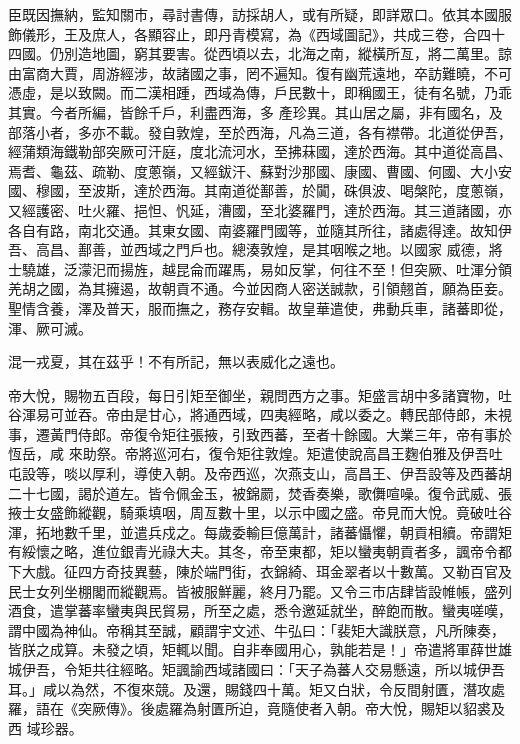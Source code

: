 \begin{pinyinscope}
 臣既因撫納，監知關市，尋討書傳，訪採胡人，或有所疑，即詳眾口。依其本國服飾儀形，王及庶人，各顯容止，即丹青模寫，為《西域圖記》，共成三卷，合四十四國。仍別造地圖，窮其要害。從西頃以去，北海之南，縱橫所亙，將二萬里。諒由富商大賈，周游經涉，故諸國之事，罔不遍知。復有幽荒遠地，卒訪難曉，不可憑虛，是以致闕。而二漢相踵，西域為傳，戶民數十，即稱國王，徒有名號，乃乖其實。今者所編，皆餘千戶，利盡西海，多
 產珍異。其山居之屬，非有國名，及部落小者，多亦不載。發自敦煌，至於西海，凡為三道，各有襟帶。北道從伊吾，經蒲類海鐵勒部突厥可汗庭，度北流河水，至拂菻國，達於西海。其中道從高昌、焉耆、龜茲、疏勒、度蔥嶺，又經鈸汗、蘇對沙那國、康國、曹國、何國、大小安國、穆國，至波斯，達於西海。其南道從鄯善，於闐，硃俱波、喝槃陀，度蔥嶺，又經護密、吐火羅、挹怛、忛延，漕國，至北婆羅門，達於西海。其三道諸國，亦各自有路，南北交通。其東女國、南婆羅門國等，並隨其所往，諸處得達。故知伊吾、高昌、鄯善，並西域之門戶也。總湊敦煌，是其咽喉之地。以國家
 威德，將士驍雄，泛濛汜而揚旌，越昆侖而躍馬，易如反掌，何往不至！但突厥、吐渾分領羌胡之國，為其擁遏，故朝貢不通。今並因商人密送誠款，引領翹首，願為臣妾。聖情含養，澤及普天，服而撫之，務存安輯。故皇華遣使，弗動兵車，諸蕃即從，渾、厥可滅。



 混一戎夏，其在茲乎！不有所記，無以表威化之遠也。



 帝大悅，賜物五百段，每日引矩至御坐，親問西方之事。矩盛言胡中多諸寶物，吐谷渾易可並吞。帝由是甘心，將通西域，四夷經略，咸以委之。轉民部侍郎，未視事，遷黃門侍郎。帝復令矩往張掖，引致西蕃，至者十餘國。大業三年，帝有事於恆岳，咸
 來助祭。帝將巡河右，復令矩往敦煌。矩遣使說高昌王麴伯雅及伊吾吐屯設等，啖以厚利，導使入朝。及帝西巡，次燕支山，高昌王、伊吾設等及西蕃胡二十七國，謁於道左。皆令佩金玉，被錦罽，焚香奏樂，歌儛喧噪。復令武威、張掖士女盛飾縱觀，騎乘填咽，周亙數十里，以示中國之盛。帝見而大悅。竟破吐谷渾，拓地數千里，並遣兵戍之。每歲委輸巨億萬計，諸蕃懾懼，朝貢相續。帝謂矩有綏懷之略，進位銀青光祿大夫。其冬，帝至東都，矩以蠻夷朝貢者多，諷帝令都下大戲。征四方奇技異藝，陳於端門街，衣錦綺、珥金翠者以十數萬。又勒百官及
 民士女列坐棚閣而縱觀焉。皆被服鮮麗，終月乃罷。又令三市店肆皆設帷帳，盛列酒食，遣掌蕃率蠻夷與民貿易，所至之處，悉令邀延就坐，醉飽而散。蠻夷嗟嘆，謂中國為神仙。帝稱其至誠，顧謂宇文述、牛弘曰：「裴矩大識朕意，凡所陳奏，皆朕之成算。未發之頃，矩輒以聞。自非奉國用心，孰能若是！」帝遣將軍薛世雄城伊吾，令矩共往經略。矩諷諭西域諸國曰：「天子為蕃人交易懸遠，所以城伊吾耳。」咸以為然，不復來競。及還，賜錢四十萬。矩又白狀，令反間射匱，潛攻處羅，語在《突厥傳》。後處羅為射匱所迫，竟隨使者入朝。帝大悅，賜矩以貂裘及西
 域珍器。




\end{pinyinscope}
